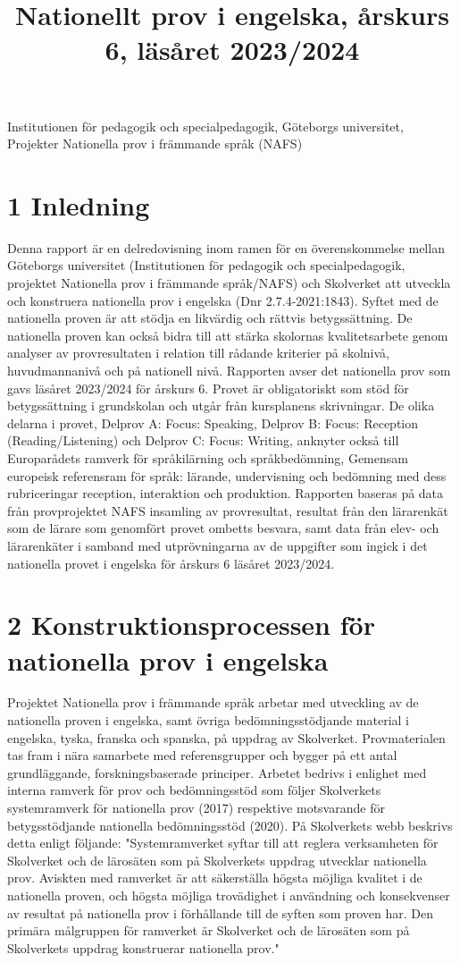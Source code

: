 \title{
Nationellt prov i engelska, årskurs 6, läsåret 2023/2024
}
Institutionen för pedagogik och specialpedagogik, Göteborgs universitet, Projekter Nationella prov i främmande språk (NAFS)
\section*{1 Inledning}
Denna rapport är en delredovisning inom ramen för en överenskommelse mellan Göteborgs universitet (Institutionen för pedagogik och specialpedagogik, projektet Nationella prov i främmande språk/NAFS) och Skolverket att utveckla och konstruera nationella prov i engelska (Dnr 2.7.4-2021:1843). Syftet med de nationella proven är att stödja en likvärdig och rättvis betygssättning. De nationella proven kan också bidra till att stärka skolornas kvalitetsarbete genom analyser av provresultaten i relation till rådande kriterier på skolnivå, huvudmannanivå och på nationell nivå.
Rapporten avser det nationella prov som gavs läsåret 2023/2024 för årskurs 6. Provet är obligatoriskt som stöd för betygssättning i grundskolan och utgår från kursplanens skrivningar. De olika delarna i provet, Delprov A: Focus: Speaking, Delprov B: Focus: Reception (Reading/Listening) och Delprov C: Focus: Writing, anknyter också till Europarådets ramverk för språkilärning och språkbedömning, Gemensam europeisk referensram för språk: lärande, undervisning och bedömning med dess rubriceringar reception, interaktion och produktion.
Rapporten baseras på data från provprojektet NAFS insamling av provresultat, resultat från den lärarenkät som de lärare som genomfört provet ombetts besvara, samt data från elev- och lärarenkäter i samband med utprövningarna av de uppgifter som ingick i det nationella provet i engelska för årskurs 6 läsåret 2023/2024.
\section*{2 Konstruktionsprocessen för nationella prov i engelska}
Projektet Nationella prov i främmande språk arbetar med utveckling av de nationella proven i engelska, samt övriga bedömningsstödjande material i engelska, tyska, franska och spanska, på uppdrag av Skolverket. Provmaterialen tas fram i nära samarbete med referensgrupper och bygger på ett antal grundläggande, forskningsbaserade principer. Arbetet bedrivs i enlighet med interna ramverk för prov och bedömningsstöd som följer Skolverkets systemramverk för nationella prov (2017) respektive motsvarande för betygsstödjande nationella bedömningsstöd (2020). På Skolverkets webb beskrivs detta enligt följande: "Systemramverket syftar till att reglera verksamheten för Skolverket och de lärosäten som på Skolverkets uppdrag utvecklar nationella prov. Aviskten med ramverket är att säkerställa högsta möjliga kvalitet i de nationella proven, och högsta möjliga trovädighet i användning och konsekvenser av resultat på nationella prov i förhållande till de syften som proven har. Den primära målgruppen för ramverket är Skolverket och de lärosäten som på Skolverkets uppdrag konstruerar nationella prov."

